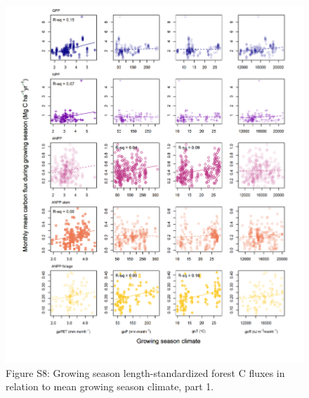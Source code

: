 \documentclass[
]{article}
\begin{document}
\newpage
\begin{figure}[H]
\includegraphics[width=1\linewidth]{tables_figures/gridded_growing_season1} \caption{Figure S8: Growing season length-standardized forest C fluxes in relation to mean growing season climate, part 1.}\label{fig:unnamed-chunk-16}
\end{figure}
\end{document}
